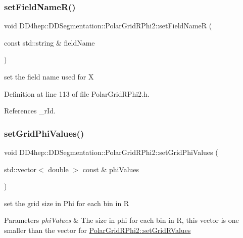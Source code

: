 \subsubsection{\texorpdfstring{set\+Field\+Name\+R()}{setFieldNameR()}}
{\footnotesize\ttfamily void D\+D4hep\+::\+D\+D\+Segmentation\+::\+Polar\+Grid\+R\+Phi2\+::set\+Field\+NameR (\begin{DoxyParamCaption}\item[{const std\+::string \&}]{field\+Name }\end{DoxyParamCaption})\hspace{0.3cm}{\ttfamily [inline]}}



set the field name used for X 



Definition at line 113 of file Polar\+Grid\+R\+Phi2.\+h.



References \+\_\+r\+Id.

\hypertarget{class_d_d4hep_1_1_d_d_segmentation_1_1_polar_grid_r_phi2_a738e77165e575ee463fab4e5daec543b}{}\label{class_d_d4hep_1_1_d_d_segmentation_1_1_polar_grid_r_phi2_a738e77165e575ee463fab4e5daec543b} 
\subsubsection{\texorpdfstring{set\+Grid\+Phi\+Values()}{setGridPhiValues()}}
{\footnotesize\ttfamily void D\+D4hep\+::\+D\+D\+Segmentation\+::\+Polar\+Grid\+R\+Phi2\+::set\+Grid\+Phi\+Values (\begin{DoxyParamCaption}\item[{std\+::vector$<$ double $>$ const \&}]{phi\+Values }\end{DoxyParamCaption})\hspace{0.3cm}{\ttfamily [inline]}}

set the grid size in Phi for each bin in R 
\begin{DoxyParams}{Parameters}
{\em phi\+Values} & The size in phi for each bin in R, this vector is one smaller than the vector for \hyperlink{class_d_d4hep_1_1_d_d_segmentation_1_1_polar_grid_r_phi2_a2194e846c26953f06cc74481d8aadeb4}{Polar\+Grid\+R\+Phi2\+::set\+Grid\+R\+Values} \\
\hline
\end{DoxyParams}


